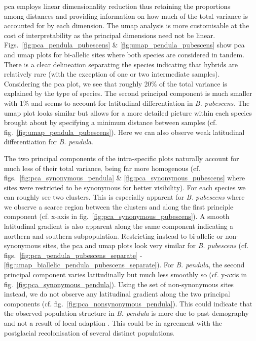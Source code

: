 \documentclass[hidelinks,11pt]{article}
\newcommand{\pendula}{\textit{B. pendula}}
\newcommand{\pubescens}{\textit{B. pubescens}}
\begin{document}
{    \acrfull{pca} employs linear dimensionality reduction thus retaining the proportions among distances and providing information on how much of the total variance is accounted for by each dimension. The \acrfull{umap} analysis is more customisable at the cost of interpretability as the principal dimensions need not be linear. Figs.~\ref{fig:pca_pendula_pubescens} \& \ref{fig:umap_pendula_pubescens} show \acrshort{pca} and \acrshort{umap} plots for bi-allelic sites where both species are considered in tandem. There is a clear delineation separating the species indicating that hybrids are relatively rare (with the exception of one or two intermediate samples). Considering the \acrshort{pca} plot, we see that roughly 20\% of the total variance is explained by the type of species. The second principal component is much smaller with 1\% and seems to account for latitudinal differentiation in \pubescens{}. The \acrshort{umap} plot looks similar but allows for a more detailed picture within each species brought about by specifying a minimum distance between samples (cf. fig.~\ref{fig:umap_pendula_pubescens}). Here we can also observe weak latitudinal differentiation for \pendula{}.

    The two principal components of the intra-specific plots naturally account for much less of their total variance, being far more homogenous (cf. figs.~\ref{fig:pca_synonymous_pendula} \& \ref{fig:pca_synonymous_pubescens} where sites were restricted to be synonymous for better visibility). For each species we can roughly see two clusters. This is especially apparent for \pubescens{} where we observe a scarce region between the clusters and along the first principle component (cf. x-axis in fig.~\ref{fig:pca_synonymous_pubescens}). A smooth latitudinal gradient is also apparent along the same component indicating a northern and southern subpopulation. Restricting instead to bi-allelic or non-synonymous sites, the \acrshort{pca} and \acrshort{umap} plots look very similar for \pubescens{} (cf. figs.~\ref{fig:pca_pendula_pubescens_separate} - \ref{fig:umap_biallelic_pendula_pubescens_separate}). For \pendula{}, the second principal component varies latitudinally but much less smoothly so (cf. y-axis in fig.~\ref{fig:pca_synonymous_pendula}). Using the set of non-synonymous sites instead, we do not observe any latitudinal gradient along the two principal components (cf. fig.~\ref{fig:pca_nonsynonymous_pendula}). This could indicate that the observed population structure in \pendula{} is more due to past demography and not a result of local adaption . This could be in agreement with the postglacial recolonisation of several distinct populations.

}
\end{document}
